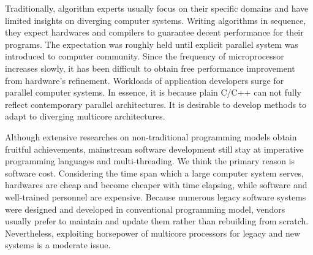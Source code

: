 \documentclass[10pt, conference, compsocconf]{IEEEtran}
\begin{document}
Traditionally, algorithm experts usually focus on their specific domains and have
limited insights on diverging computer systems. Writing algorithms in
sequence, they expect hardwares
and compilers to guarantee decent performance for their
programs. The expectation was roughly held until explicit parallel system was
introduced to computer community. Since the frequency of microprocessor
increases slowly, it has been difficult to obtain free
performance improvement from hardware's refinement. Workloads
of application developers surge for parallel computer
systems. In essence, it is because plain C/C++ can not fully reflect contemporary
parallel architectures. It is desirable to develop
methods to adapt to diverging multicore architectures.

Although extensive researches on non-traditional
programming models obtain fruitful achievements, mainstream software development still
stay at imperative programming languages and multi-threading.
We think the primary reason is software cost. Considering the time span
which a large computer system serves, hardwares are cheap and become
cheaper with time elapsing, while software and well-trained personnel are
expensive. Because numerous legacy software systems were designed and
developed in conventional programming model, vendors usually prefer to
maintain and update them rather than
rebuilding from scratch. Nevertheless, exploiting horsepower of
multicore processors for legacy and new systems is a moderate issue.




\end{document}
